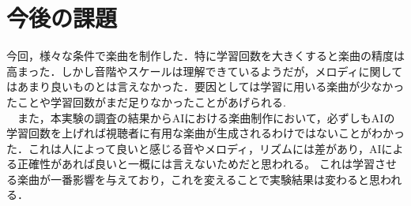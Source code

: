 \section{今後の課題}
今回，様々な条件で楽曲を制作した．特に学習回数を大きくすると楽曲の精度は高まった．しかし音階やスケールは理解できているようだが，メロディに関してはあまり良いものとは言えなかった．要因としては学習に用いる楽曲が少なかったことや学習回数がまだ足りなかったことがあげられる.\\
　また，本実験の調査の結果からAIにおける楽曲制作において，必ずしもAIの学習回数を上げれば視聴者に有用な楽曲が生成されるわけではないことがわかった．これは人によって良いと感じる音やメロディ，リズムには差があり，AIによる正確性があれば良いと一概には言えないためだと思われる。
これは学習させる楽曲が一番影響を与えており，これを変えることで実験結果は変わると思われる．